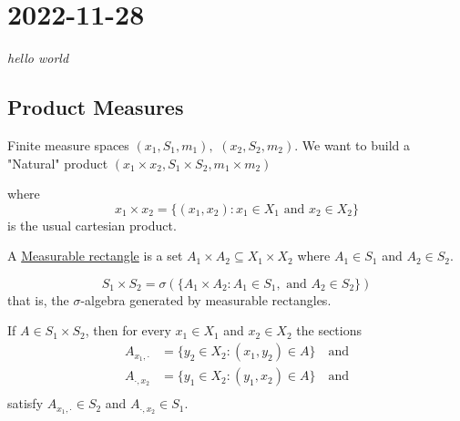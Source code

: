 \section{2022-11-28}

\epigraph{\textit{hello world}}{}


\subsection{Product Measures}

Finite measure spaces $(x_1, S_1, m_1),$ $(x_2, S_2, m_2)$. We want to build a "Natural" product
$(x_1 \times x_2, S_1 \times S_2, m_1 \times m_2 )$ 

where
\[
	x_1 \times x_2 = \{ (x_1, x_2) : x_1 \in X_1 \text{ and } x_2 \in X_2 \}
\] is the usual cartesian product. 


A \underline{Measurable rectangle} is a set $A_1 \times A_2 \subseteq X_1 \times X_2$ where $A_1 \in S_1$ and $A_2 \in S_2$.

\begin{definition}
	\[
		S_1 \times S_2 = \sigma(\{ A_1 \times A_2 : A_1 \in S_1, \text{ and } A_2 \in S_2 \} )
	\] that is, the $\sigma$-algebra generated by measurable rectangles.
\end{definition}

\begin{lemma}
	If $A \in S_1 \times S_2 $, then for every $x_1 \in X_1$ and $x_2 \in X_2$ the sections
	\begin{align*}
		A_{x_1, \cdot } &= \{ y_2 \in X_2 : (x_1 , y_2 ) \in A \} \quad \text{and} \\
		A_{\cdot, x_2 } &= \{ y_1 \in X_2 : (y_1 , x_2 ) \in A \} \quad \text{and} \\
	\end{align*} satisfy $A_{x_1 , \cdot} \in S_2$ and $A_{\cdot, x_2} \in S_1$.
\end{lemma}

